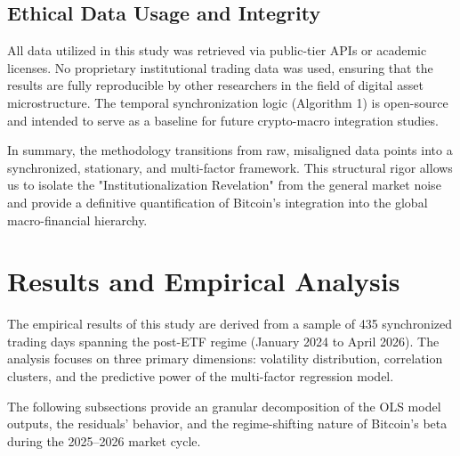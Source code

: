\documentclass[10pt, conference, compsocconf]{IEEEtran}
\begin{document}
\subsection{Ethical Data Usage and Integrity}

All data utilized in this study was retrieved via public-tier APIs or academic licenses. No proprietary institutional trading data was used, ensuring that the results are fully reproducible by other researchers in the field of digital asset microstructure. The temporal synchronization logic (Algorithm 1) is open-source and intended to serve as a baseline for future crypto-macro integration studies.


In summary, the methodology transitions from raw, misaligned data points into a synchronized, stationary, and multi-factor framework. This structural rigor allows us to isolate the "Institutionalization Revelation" from the general market noise and provide a definitive quantification of Bitcoin's integration into the global macro-financial hierarchy.


\section{Results and Empirical Analysis}

The empirical results of this study are derived from a sample of 435 synchronized trading days spanning the post-ETF regime (January 2024 to April 2026). The analysis focuses on three primary dimensions: volatility distribution, correlation clusters, and the predictive power of the multi-factor regression model.

The following subsections provide an granular decomposition of the OLS model outputs, the residuals' behavior, and the regime-shifting nature of Bitcoin’s beta during the 2025--2026 market cycle.

\end{document}
